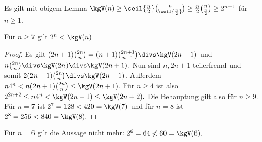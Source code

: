 Es gilt mit obigem Lemma
\begin{math}
    \kgV(n) \ge \ceil{\frac{n}{2}} \binom{n}{\ceil{\frac{n}{2}}}
    \ge \frac{n}{2} \binom{n}{\frac{n}{2}}
    \ge 2^{n-1}
\end{math}
für $n \ge 1$.

\begin{st}
    Für $n \ge 7$ gilt
    \begin{math}
        2^n < \kgV(n)
    \end{math}
    \begin{proof}
        Es gilt
        \begin{math}
            (2n+1) \binom{2n}{n} = (n+1) \binom{2n+1}{n+1} \divs \kgV(2n+1)
        \end{math}
        und
        \begin{math}
            n\binom{2n}{n} \divs \kgV(2n) \divs \kgV(2n+1).
        \end{math}
        Nun sind $n, 2n + 1$ teilerfremd und somit $2 (2n+1) \binom{2n}{n} \divs \kgV(2n+1)$.
        Außerdem
        \begin{math}
            n 4^n
            < n (2n+1) \binom{2n}{n}
            \le \kgV(2n+1).
        \end{math}
        Für $n \ge 4$ ist also
        \begin{math}
            2^{2n+2} \le n 4^n < \kgV(2n+1) \le \kgV(2n+2).
        \end{math}
        Die Behauptung gilt also für $n \ge 9$.
        Für $n = 7$ ist
        \begin{math}
            2^7 = 128 < 420 = \kgV(7)
        \end{math}
        und für $n = 8$ ist
        \begin{math}
            2^8 = 256 < 840 = \kgV(8).
        \end{math}
    \end{proof}
    \begin{note}
        Für $n = 6$ gilt die Aussage nicht mehr:
        \begin{math}
            2^6 = 64 \not< 60 = \kgV(6).
        \end{math}
    \end{note}
\end{st}


